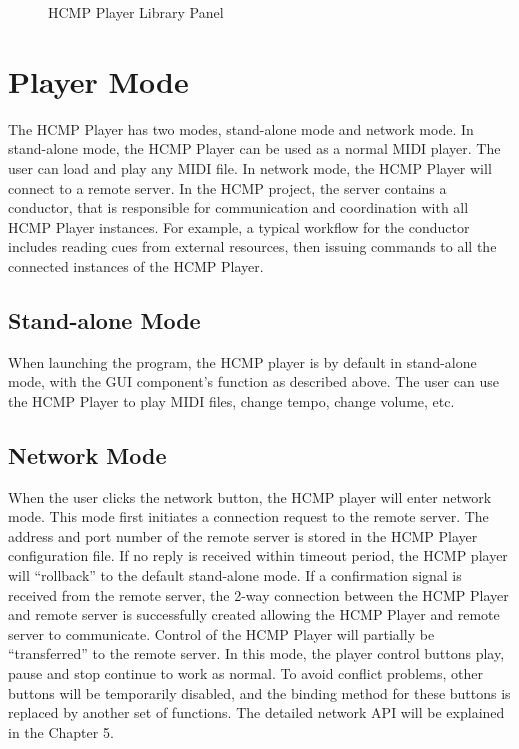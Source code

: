 \begin{figure}[H]
\caption{HCMP Player Library Panel}
\end{figure}

\section{Player Mode}

The HCMP Player has two modes, stand-alone mode and network mode. 
In stand-alone mode, the HCMP Player can be used as a normal MIDI player. 
The user can load and play any MIDI file. In network mode, 
the HCMP Player will connect to a remote 
server. In the HCMP project, the server contains a conductor, that 
is responsible for communication and coordination with all HCMP Player instances. 
For example, 
a typical workflow for the conductor includes reading cues from external resources, 
then issuing commands to all the connected instances of the HCMP Player.

\subsection{Stand-alone Mode}

When launching the program, the HCMP player is by default in stand-alone mode, 
with the GUI component's function as described above. 
The user can use the HCMP Player to play MIDI files, change tempo, change volume, etc.


\subsection{Network Mode}

When the user clicks the network button, 
the HCMP player will enter
network mode. This mode first initiates a connection request 
to the remote server. The address and port number of the remote server is 
stored in the HCMP Player configuration file. If no reply is received within
timeout period, the HCMP player will ``rollback'' to the default stand-alone mode.
If a confirmation signal is received from the
remote server, the 2-way connection between the HCMP Player and 
remote server is successfully created allowing the HCMP Player and 
remote server to communicate. Control of the HCMP 
Player will partially be ``transferred'' to the remote server. 
In this mode, the player control buttons play, pause   
and stop continue to work as normal. To avoid conflict problems, other buttons will 
be temporarily disabled, and the binding method for these buttons is replaced by
another set of functions. The detailed network API will be explained  
in the Chapter 5.
